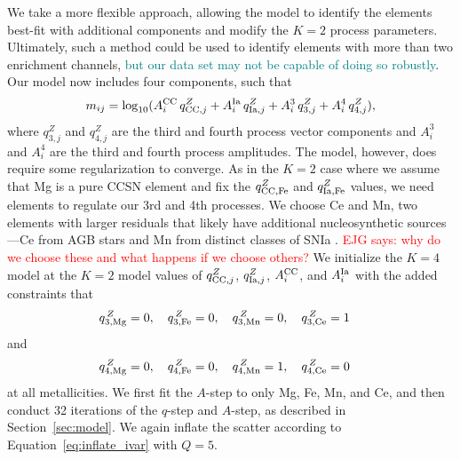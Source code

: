 \documentclass[modern]{aastex631}
\newcommand{\qcc}{q_{{\rm CC,}j}^{Z}}
\newcommand{\qccFe}{q_{{\rm CC, Fe}}^{Z}}
\newcommand{\qIa}{q_{{\rm Ia,}j}^{Z}}
\newcommand{\qIaFe}{q_{{\rm Ia,Fe}}^{Z}}
\newcommand{\Acc}{A^{\rm CC}_{i}}
\newcommand{\AIa}{A^{\rm Ia}_{i}}
\newcommand{\ejg}[1]{\textcolor{red}{EJG says: #1}}
\newcommand{\add}[1]{\textcolor{teal}{#1}}
\begin{document}
We take a more flexible approach, allowing the model to identify the elements best-fit with additional components and modify the $K=2$ process parameters. Ultimately, such a method could be used to identify elements with more than two enrichment channels, \add{but our data set may not be capable of doing so robustly}. Our model now includes four components, such that
\begin{equation}\label{eq:mij_4}
    m_{ij} = \log_{10}(\Acc\,\qcc + \AIa\,\qIa + A_{i}^{3}\,q_{3, j}^{Z} + A_{i}^{4}\,q_{4, j}^{Z}),
\end{equation}
where $q_{3, j}^{Z}$ and $q_{4, j}^{Z}$ are the third and fourth process vector components and $ A_{i}^3$ and $A_{i}^4$ are the third and fourth process amplitudes. The model, however, does require some regularization to converge. As in the $K=2$ case where we assume that Mg is a pure CCSN element and fix the $\qccFe$ and $\qIaFe$ values, we need elements to regulate our 3rd and 4th processes. We choose Ce and Mn, two elements with larger residuals that likely have additional nucleosynthetic sources---Ce from AGB stars and Mn from distinct classes of SNIa \citep[e.g.][]{gallino1998, reyes2020, gronow2021}. \ejg{why do we choose these and what happens if we choose others?} We initialize the $K=4$ model at the $K=2$ model values of $\qcc$, $\qIa$, $\Acc$, and $\AIa$ with the added constraints that 
\begin{equation}\label{eq:q3_z}
    q_{{\rm 3, Mg}}^{\,Z} = 0, \quad 
    q_{{\rm 3, Fe}}^{\,Z} = 0,  \quad 
    q_{{\rm 3, Mn}}^{\,Z} = 0, \quad 
    q_{{\rm 3, Ce}}^{\,Z} = 1 \quad 
\end{equation}
and 
\begin{equation}\label{eq:q4_z}
    q_{{\rm 4, Mg}}^{\,Z} = 0, \quad 
    q_{{\rm 4, Fe}}^{\,Z} = 0,  \quad 
    q_{{\rm 4, Mn}}^{\,Z} = 1, \quad 
    q_{{\rm 4, Ce}}^{\,Z} = 0 \quad 
\end{equation}
at all metallicities. We first fit the $A$-step to only Mg, Fe, Mn, and Ce, and then conduct 32 iterations of the $q$-step and $A$-step, as described in Section~\ref{sec:model}. We again inflate the scatter according to Equation~\ref{eq:inflate_ivar} with $Q=5$. 
\end{document}
